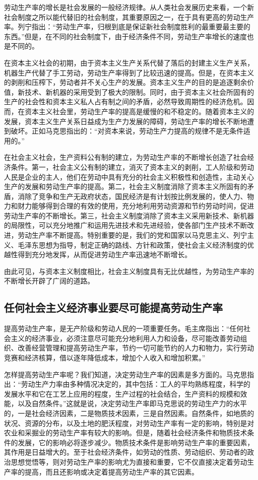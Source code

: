 \documentclass{book}
\begin{document}
劳动生产率的增长是社会发展的一般经济规律。从人类社会发展历史来看，一个新社会制度之所以能代替旧的社会制度，其重要原因之一，在于具有更高的劳动生产率。列宁指出：“劳动生产率，归根到底是保证新社会制度胜利的最重要最主要的东西。”但是，在不同的社会制度下，由于经济条件不同，劳动生产率增长的速度也是不同的。

在资本主义社会的初期，由于资本主义生产关系代替了落后的封建主义生产关系，机器生产代替了手工劳动，劳动生产率得到了比较迅速的提高。但是，在资本主义的剥削和压榨下，劳动者并不关心生产的发展。资本主义生产的目的是追逐剩余价值，新技术、新机器的采用受到了极大的限制。同时，由于资本主义社会所固有的生产的社会性和资本主义私人占有制之间的矛盾，必然导致周期性的经济危机。因而，在资本主义社会里，劳动生产率的提高是缓慢的和不稳定的。随着资本主义的发展，资本主义生产关系日益成为生产力发展的障碍，劳动生产率的增长不断地遭到破坏。正如马克思指出的：“对资本来说，劳动生产力提高的规律不是无条件适用的。”

在社会主义社会，生产资料公有制的建立，为劳动生产率的不断增长创造了社会经济条件。第一，社会主义公有制的建立，消灭了资本主义的剥削，工人阶级和劳动人民是企业的主人，他们在劳动中具有充分的社会主义积极性和创造性，主动关心生产的发展和劳动生产率的提高。第二，社会主义制度消除了资本主义所固有的矛盾，消除了竞争和生产无政府状态，国民经济是有计划按比例发展的，使人力、物力和财力能够得到合理的有效的使用，充分地利用劳动资源和节约劳动时间，促进劳动生产率的不断增长。第三，社会主义制度消除了资本主义采用新技术、新机器的局限性，可以充分地推广和运用先进技术和先进经验，使各部门生产技术不断改进，劳动生产率不断提高。特别重要的是，我们的党和国家以马克思主义、列宁主义、毛泽东思想为指导，制定正确的路线、方针和政策，使社会主义经济制度的优越性得到充分地发挥，从而促进劳动生产率迅速地不断增长。

由此可见，与资本主义制度相比，社会主义制度具有无比优越性，为劳动生产率的不断增长开辟了广阔的道路。

\subsection{任何社会主义经济事业要尽可能提高劳动生产率}

提高劳动生产率，是无产阶级和劳动人民的一项重要任务。毛主席指出：“任何社会主义的经济事业，必须注意尽可能充分地利用人力和设备，尽可能改善劳动组织、改善经营管理和提高劳动生产率，节约一切可能节约的人力和物力，实行劳动竞赛和经济核算，借以逐年降低成本，增加个人收入和增加积累。”

怎样提高劳动生产率呢？我们知道，决定劳动生产率的因素是多方面的。马克思指出：“劳动生产力率由多种情况决定的，其中包括：工人的平均熟练程度，科学的发展水平和它在工艺上应用的程度，生产过程的社会结合，生产资料的规模和效能，以及自然条件。”这就是说，决定劳动生产率即马克思说的劳动生产力的水平的，一是社会经济因素，二是物质技术因素，三是自然因素。自然条件，如地质的状况、资源的分布，以及土地的肥沃程度，对劳动生产率有一定的影响，特别是对农业和采掘业的劳动生产率有较大的影响。但是，随着社会经济条件和物质技术条件的发展，它的影响必将逐步减少。物质技术条件是影响劳动生产率的重要因素，其作用是日益增大的。至于社会经济条件，如劳动的性质、劳动组织、劳动者的政治思想觉悟等，则对劳动生产率的影响尤为直接和重要，它不仅直接决定着劳动生产率的提高，而且还影响或决定着提高劳动生产率的其它因素。
\end{document}
